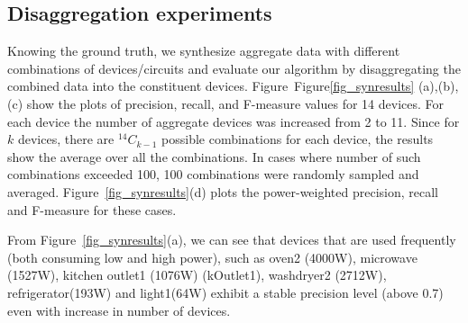%
%
%
%
%


\subsection{Disaggregation experiments}
Knowing the ground truth,
we synthesize aggregate data with different combinations of devices/circuits
and evaluate our algorithm by disaggregating the combined data into the
constituent devices.
Figure~Figure\ref{fig_synresults} (a),(b),(c) show the plots
of precision, recall, and F-measure values
for 14 devices.
For each device the number of aggregate devices was increased
from 2 to 11.
Since for $k$ devices, there are $^{14}C_{k-1}$ possible combinations for each device,
the results show the average over all the combinations. In cases where number
of such combinations exceeded 100, 100 combinations were randomly sampled and
averaged.
Figure~\ref{fig_synresults}(d) plots the
power-weighted precision, recall and F-measure for these cases.

From Figure~\ref{fig_synresults}(a), we can see
that devices that are used frequently (both consuming low and high power),
such as oven2 (4000W), microwave (1527W),
kitchen outlet1 (1076W) (kOutlet1),
washdryer2 (2712W), refrigerator(193W) and light1(64W) exhibit a stable
precision level (above 0.7) even with increase in number of devices.

